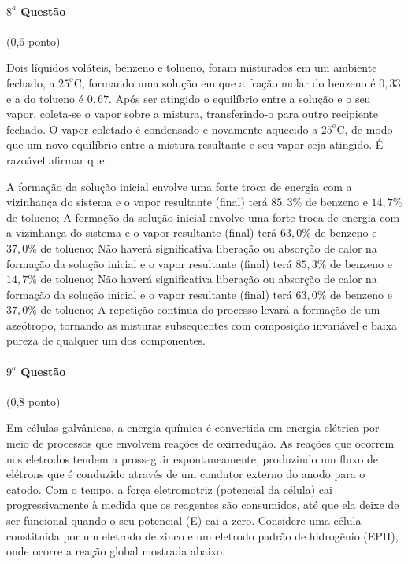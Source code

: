 \documentclass[12pt,a4paper]{article}
\begin{document}
\paragraph{$8^a$ Questão} (0,6 ponto)

Dois líquidos voláteis, benzeno e tolueno, foram misturados em um ambiente fechado, a $25^o$C, formando uma solução em que a 
fração molar do benzeno é $0,33$ e a do tolueno é $0,67$. Após ser atingido o equilíbrio entre a solução e o seu vapor, coleta-se 
o vapor sobre a mistura, transferindo-o para outro recipiente fechado. O vapor coletado é condensado e novamente aquecido a 
$25^o$C, de modo que um novo equilíbrio entre a mistura resultante e seu vapor seja atingido. É razoável afirmar que:

\begin{tasks}
\task A formação da solução inicial envolve uma forte troca de energia com a vizinhança do sistema e o vapor resultante (final) terá $85,3\%$ de benzeno 
e $14,7\%$ de tolueno;
\task A formação da solução inicial envolve uma forte troca de energia com a vizinhança do sistema e o vapor resultante (final) terá $63,0\%$ de benzeno e
$37,0\%$ de tolueno;
\task Não haverá significativa liberação ou absorção de calor na formação da solução inicial e o vapor resultante (final) terá $85,3\%$ de benzeno e 
$14,7\%$ de tolueno;
\task Não haverá significativa liberação ou absorção de calor na formação da solução inicial e o vapor resultante (final) terá $63,0\%$ de benzeno e
$37,0\%$ de tolueno;
\task A repetição contínua do processo levará a formação de um azeótropo, tornando as misturas subsequentes com composição invariável e baixa pureza de qualquer 
um dos componentes.
\end{tasks}

\paragraph{$9^a$ Questão} (0,8 ponto)

Em células galvânicas, a energia química é convertida em energia elétrica por meio de processos que envolvem reações de oxirredução. 
As reações que ocorrem nos eletrodos tendem a prosseguir espontaneamente, produzindo um fluxo de elétrons que é conduzido através de 
um condutor externo do anodo para o catodo. Com o tempo, a força eletromotriz (potencial da célula) cai progressivamente à medida que 
os reagentes são consumidos, até que ela deixe de ser funcional quando o seu potencial (E) cai a zero. Considere uma célula constituída por 
um eletrodo de zinco e um eletrodo padrão de hidrogênio (EPH), onde ocorre a reação global mostrada abaixo. 
\end{document}
